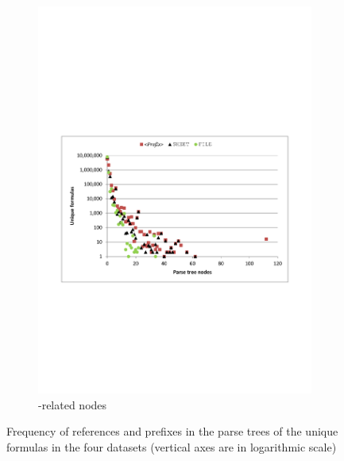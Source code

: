 \documentclass[times]{smrauth}
\begin{document}
\begin{figure}
\begin{subfigure}[b]{0.49\textwidth}
		\includegraphics[width=1\textwidth]{img/nodesPrefix}
		\caption{-related nodes}
		\label{fig:nodesPrefix}
	\end{subfigure}
	
	\caption{Frequency of references and prefixes in the parse trees of the unique formulas in the four datasets (vertical axes are in logarithmic scale)}
\end{figure}
\end{document}
